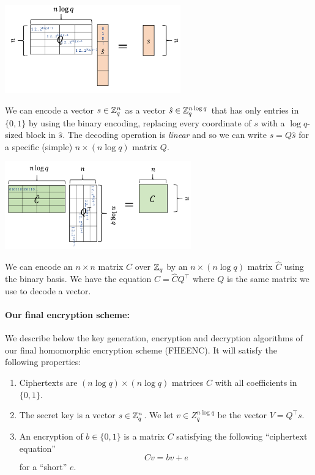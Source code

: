 \begin{marginfigure}
\centering
\includegraphics[width=\linewidth, height=1.5in, keepaspectratio]{../figure/encodevec.png}
\caption{We can encode a vector \(s\in {\mathbb{Z}}_q^n\) as a vector
\(\hat{s} \in {\mathbb{Z}}_q^{n\log q}\) that has only entries in \(\{0,1\}\) by
using the binary encoding, replacing every coordinate of \(s\) with a
\(\log q\)-sized block in \(\hat{s}\). The decoding operation is
\emph{linear} and so we can write \(s=Q\hat{s}\) for a specific (simple)
\(n \times (n\log q)\) matrix \(Q\).}
\label{encodevecfig}
\end{marginfigure}

\begin{marginfigure}
\centering
\includegraphics[width=\linewidth, height=1.5in, keepaspectratio]{../figure/encodematrix.png}
\caption{We can encode an \(n\times n\) matrix \(C\) over \({\mathbb{Z}}_q\) by an
\(n\times (n \log q)\) matrix \(\hat{C}\) using the binary basis. We
have the equation \(C=\hat{C}Q^\top\) where \(Q\) is the same matrix we
use to decode a vector.}
\label{encodematrixfig}
\end{marginfigure}

\paragraph{Our final encryption scheme:} We describe below the key
generation, encryption and decryption algorithms of our final
homomorphic encryption scheme (FHEENC). It will satisfy the following
properties:

\begin{enumerate}
\def\labelenumi{\arabic{enumi}.}
\item
  Ciphertexts are \((n \log q)\times (n\log q)\) matrices \(C\) with all
  coefficients in \(\{0,1\}\).
\item
  The secret key is a vector \(s \in {\mathbb{Z}}_q^n\). We let
  \(v \in Z_q^{n \log q}\) be the vector \(V = Q^\top s\).
\item
  An encryption of \(b\in \{0,1\}\) is a matrix \(C\) satisfying the
  following ``ciphertext equation''
  \[Cv =bv + e \label{eqciphertexteqfhe}\] for a ``short'' \(e\).
\end{enumerate}

